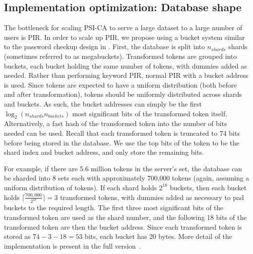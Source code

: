 \documentclass[11pt]{article} %
\newcommand{\psica}{PSI-CA\xspace}
\newcommand{\ceil}[1]{{\lceil{#1}\rceil}}
\begin{document}
\subsection{Implementation optimization: Database shape}
\label{subs:impl_optz}
The bottleneck for scaling \psica to serve a large dataset to a large number of users is PIR. In order to scale up PIR, we propose using a bucket system similar to the password checkup design in \cite{EPRINT:ALPRSSY19}. First, the database is split into $n_{shards}$ shards (sometimes referred to as megabuckets). Transformed tokens are grouped into buckets, each bucket holding the same number of tokens, with dummies added as needed. Rather than performing keyword PIR, normal PIR with a bucket address is used. Since tokens are expected to have a uniform distribution (both before and after transformation), tokens should be uniformly distributed across shards and buckets. As such, the bucket addresses can simply be the first $\log_2(n_{shards} n_{buckets})$ most significant bits of the transformed token itself. Alternatively, a fast hash of the transformed token into the number of bits needed can be used. Recall that each transformed token is truncated to 74 bits before being stored in the database. We use the top bits of the token to be the shard index and bucket address, and only store the remaining bits. 


 For example, if there are 5.6 million tokens in the server's set, the database can be sharded into 8 sets each with approximately 700,000 tokens (again, assuming a uniform distribution of tokens). If each shard holds $2^{18}$ buckets, then each bucket holds $\ceil{\frac{700,000}{2^{18}}} = 3$ transformed tokens, with dummies added as necessary to pad buckets to the required length. The first three most significant bits of the transformed token are used as the shard number, and the following 18 bits of the transformed token are then the bucket address.  Since each transformed token is stored as $74 - 3 - 18 = 53$ bits, each bucket has 20 bytes.  More detail of the implementation is present in the full version~\cite{epione}.
 
\end{document}

